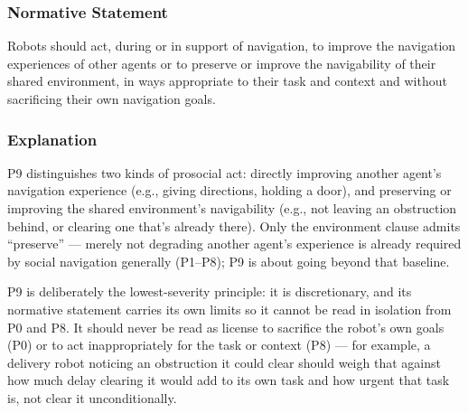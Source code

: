 \documentclass[utf8]{frontiers_suppmat} %
\begin{document}
\subsubsection{Normative Statement}\label{normative-statement-9}

Robots should act, during or in support of navigation, to improve the
navigation experiences of other agents or to preserve or improve the
navigability of their shared environment, in ways appropriate to their
task and context and without sacrificing their own navigation goals.

\subsubsection{Explanation}\label{explanation-9}

P9 distinguishes two kinds of prosocial act: directly improving another
agent's navigation experience (e.g., giving directions, holding a door),
and preserving or improving the shared environment's navigability (e.g.,
not leaving an obstruction behind, or clearing one that's already
there). Only the environment clause admits ``preserve'' --- merely not
degrading another agent's experience is already required by social
navigation generally (P1--P8); P9 is about going beyond that baseline.

P9 is deliberately the lowest-severity principle: it is discretionary,
and its normative statement carries its own limits so it cannot be read
in isolation from P0 and P8. It should never be read as license to
sacrifice the robot's own goals (P0) or to act inappropriately for the
task or context (P8) --- for example, a delivery robot noticing an
obstruction it could clear should weigh that against how much delay
clearing it would add to its own task and how urgent that task is, not
clear it unconditionally.
\end{document}
